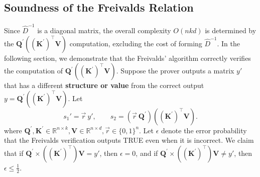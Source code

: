 \documentclass[11pt]{article}
\begin{document}
\subsection{Soundness of the Freivalds Relation}
Since $\hat{D}^{-1}$ is a diagonal matrix, the overall complexity $O(nkd)$ is determined by the $\mathbf{Q}^{'}((\mathbf{K}^{'})^\top \mathbf{V})$ computation, excluding the cost of forming $\hat{D}^{-1}$. In the following section, we demonstrate that the Freivalds’ algorithm correctly verifies the computation of $\mathbf{Q}^{'}((\mathbf{K}^{'})^\top \mathbf{V})$. Suppose the prover outputs a matrix $y'$ that has a different \textbf{structure or value} from the correct output $y=\mathbf{Q}^{'}((\mathbf{K}^{'})^\top \mathbf{V})$.
Let
\[
  s_1' = \vec{r}\ y', \qquad
  s_2 = (\vec{r}\ \mathbf{Q}^{'})((\mathbf{K}^{'})^\top \mathbf{V}).
\]
where $\mathbf{Q}^{'},\mathbf{K}^{'} \in \mathbb{R}^{n\times k}, \mathbf{V} \in \mathbb{R}^{n\times d}, \vec{r} \in \{0,1\}^n$.
Let $\epsilon$ denote the error probability that the Freivalds verification outputs TRUE even when it is incorrect. We claim that if $\mathbf{Q}^{'} \times ((\mathbf{K}^{'})^\top)\mathbf{V} = y'$, then $\epsilon = 0$, and if $\mathbf{Q}^{'} \times ((\mathbf{K}^{'})^\top)\mathbf{V} \neq y'$, then $\epsilon \leq \frac{1}{2}$.
\end{document}

